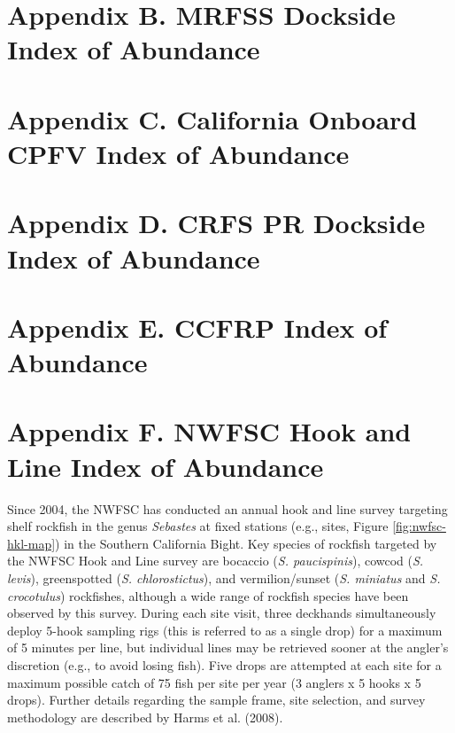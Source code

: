 \documentclass[11pt,
  english,
  letterpaper,
]{article}
\begin{document}
\hypertarget{mrfss-index}{%
\section{Appendix B. MRFSS Dockside Index of Abundance}\label{mrfss-index}}

\hypertarget{onboard-cpfv-index}{%
\section{Appendix C. California Onboard CPFV Index of Abundance}\label{onboard-cpfv-index}}

\hypertarget{crfs-pr-index}{%
\section{Appendix D. CRFS PR Dockside Index of Abundance}\label{crfs-pr-index}}

\hypertarget{ccfrp-index}{%
\section{Appendix E. CCFRP Index of Abundance}\label{ccfrp-index}}

\hypertarget{nwfsc-hkl-index}{%
\section{Appendix F. NWFSC Hook and Line Index of Abundance}\label{nwfsc-hkl-index}}

Since 2004, the NWFSC has conducted an annual hook and line survey targeting shelf rockfish in the genus \emph{Sebastes} at fixed stations (e.g., sites, Figure \ref{fig:nwfsc-hkl-map}) in the Southern California Bight. Key species of rockfish targeted by the NWFSC Hook and Line survey are bocaccio (\emph{S. paucispinis}), cowcod (\emph{S. levis}), greenspotted (\emph{S. chlorostictus}), and vermilion/sunset (\emph{S. miniatus} and \emph{S. crocotulus}) rockfishes, although a wide range of rockfish species have been observed by this survey. During each site visit, three deckhands simultaneously deploy 5-hook sampling rigs (this is referred to as a single drop) for a maximum of 5 minutes per line, but individual lines may be retrieved sooner at the angler's discretion (e.g., to avoid losing fish). Five drops are attempted at each site for a maximum possible catch of 75 fish per site per year (3 anglers x 5 hooks x 5 drops). Further details regarding the sample frame, site selection, and survey methodology are described by Harms et al. (2008).
\end{document}
